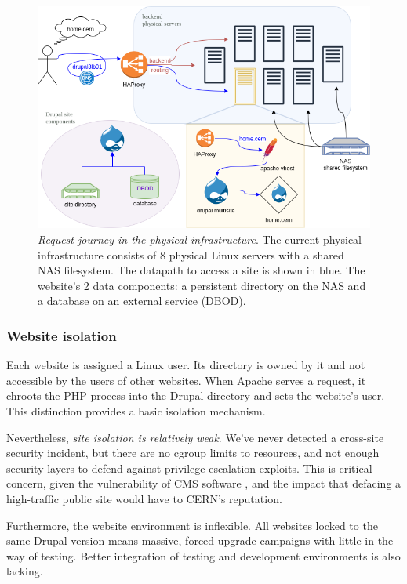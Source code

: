 \begin{figure}[ht]
    \centering
    \hspace{-2em}
    \includegraphics[width=\textwidth]{figures/drupal-physical-request-journey}
    \caption{\emph{Request journey in the physical infrastructure}.
    The current physical infrastructure consists of 8 physical Linux servers with a shared NAS filesystem.
    The {\color{blue} datapath} to access a site is shown in blue.
    The website's {\color{green} 2 data components}: a persistent directory on the NAS and a database on an external service (DBOD).
    }
    \label{fig:drupal-physical-request-journey}
\end{figure}

\subsubsection*{Website isolation}

Each website is assigned a Linux user.
Its directory is owned by it and not accessible by the users of other websites.
When Apache serves a request, it chroots the PHP process into the Drupal directory and sets the website's user.
This distinction provides a basic isolation mechanism.

Nevertheless, \emph{site isolation is relatively weak}.
We've never detected a cross-site security incident,
but there are no cgroup limits to resources, and not enough security layers to defend against privilege escalation exploits.
This is critical concern, given the vulnerability of CMS software \cite{shteiman_why_2014},
and the impact that defacing a high-traffic public site would have to CERN's reputation.

Furthermore, the website environment is inflexible.
All websites locked to the same Drupal version means massive, forced upgrade campaigns with little in the way of testing.
Better integration of testing and development environments is also lacking.

